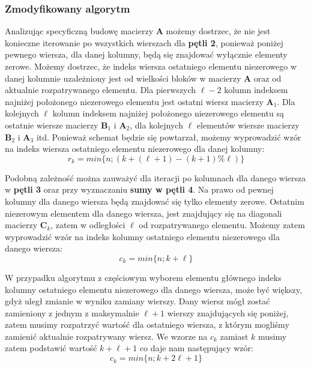 \documentclass[12pt]{article}
\begin{document}
\subsubsection*{Zmodyfikowany algorytm}
Analizując specyficzną budowę macierzy $\textbf{A}$ możemy dostrzec, że nie jest konieczne iterowanie po wszystkich wierszach dla \textbf{pętli 2}, ponieważ poniżej pewnego wiersza, dla danej kolumny, będą się znajdować wyłącznie elementy zerowe. Możemy dostrzec, że indeks wiersza ostatniego elementu niezerowego w danej kolumnie uzależniony jest od wielkości bloków w macierzy $\textbf{A}$ oraz od aktualnie rozpatrywanego elementu. Dla pierwszych $\ell - 2$ kolumn indeksem najniżej położonego niezerowego elementu jest ostatni wiersz macierzy $\textbf{A}_1$. Dla kolejnych $\ell$ kolumn indeksem najniżej położonego niezerowego elementu są ostatnie wiersze macierzy $\textbf{B}_1$ i $\textbf{A}_2$, dla kolejnych $\ell$ elementów wiersze macierzy $\textbf{B}_2$ i $\textbf{A}_3$ itd. Ponieważ schemat będzie się powtarzał, możemy wyprowadzić wzór na indeks wiersza ostatniego elementu niezerowego dla danej kolumny:
\begin{equation}
	r_k = min\{n; (k+(\ell+1)-(k+1)\%\ell)\}
\end{equation}

Podobną zależność można zauważyć dla iteracji po kolumnach dla danego wiersza w \textbf{pętli 3} oraz przy wyznaczaniu \textbf{sumy w pętli 4}. Na prawo od pewnej kolumny dla danego wiersza będą znajdować się tylko elementy zerowe. Ostatnim niezerowym elementem dla danego wiersza, jest znajdujący się na diagonali macierzy $\textbf{C}_k$, zatem w odległości $\ell$ od rozpatrywanego elementu. Możemy zatem wyprowadzić wzór na indeks kolumny ostatniego elementu niezerowego dla danego wiersza:
\begin{equation}
	c_k = min\{n; k + \ell\}
\end{equation}

W przypadku algorytmu z częściowym wyborem elementu głównego indeks kolumny ostatniego elementu niezerowego dla danego wiersza, może być większy, gdyż uległ zmianie w wyniku zamiany wierszy. Dany wiersz mógł zostać zamieniony z jednym z maksymalnie $\ell + 1$ wierszy znajdujących się poniżej, zatem musimy rozpatrzyć wartość dla ostatniego wiersza, z którym mogliśmy zamienić aktualnie rozpatrywany wiersz. We wzorze na $c_k$ zamiast $k$ musimy zatem podstawić wartość $k + \ell + 1$ co daje nam następujący wzór:
\begin{equation}
	c_k = min\{n; k + 2\ell + 1\}
\end{equation}
\end{document}
